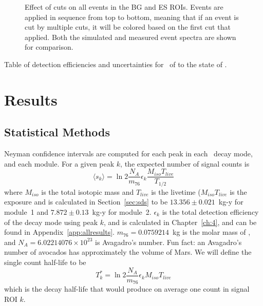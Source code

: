 \documentclass[/main.tex]{subfiles}
\begin{document}
\begin{figure}
  \centering
  \caption[Effect of data cuts on ROI events in measured and simulated data]{\label{fig:cutsroi}
    Effect of cuts on all events in the BG and ES ROIs. Events are applied in sequence from top to bottom, meaning that if an event is cut by multiple cuts, it will be colored based on the first cut that applied. Both the simulated and measured event spectra are shown for comparison.
  }
\end{figure}

\begin{table}
  \centering
  
  \caption[Detection efficiency summary for \tnbb\ to the  state of ]{\label{tab:bgcutstable}
    Table of detection efficiencies and uncertainties for \tnbb\ of  to the  state of .
  }
\end{table}

\section{Results}


\subsection{Statistical Methods}
Neyman confidence intervals are computed for each peak in each \bbes\ decay mode, and each module.
For a given peak $k$, the expected number of signal counts is
\begin{equation}
  \langle s_k\rangle = \ln2 \frac{N_A}{m_{76}}\epsilon_k\frac{M_{iso}T_{live}}{T_{1/2}}
\end{equation}
where $M_{iso}$ is the total isotopic mass and $T_{live}$ is the livetime ($M_{iso}T_{live}$ is the exposure and is calculated in Section~\ref{sec:sds} to be $13.356\pm0.021$~kg-y for module~1 and $7.872\pm0.13$~kg-y for module~2.
$\epsilon_k$ is the total detection efficiency of the decay mode using peak $k$, and is calculated in Chapter~\ref{ch:4}, and can be found in Appendix~\ref{app:allresults}.
$m_{76}=0.0759214$~kg is the molar mass of , and $N_A=6.02214076\times10^{23}$ is Avagadro's number.
Fun fact: an Avagadro's number of avocados has approximately the volume of Mars.
We will define the single count half-life to be
\begin{equation}
  T^*_k=\ln2 \frac{N_A}{m_{76}}\epsilon_kM_{iso}T_{live}
\end{equation}
which is the decay half-life that would produce on average one count in signal ROI $k$.
\end{document}

